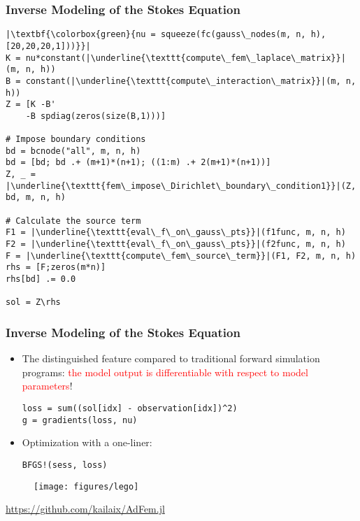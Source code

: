 \documentclass[usenames,dvipsnames]{beamer}
\begin{document}
\begin{frame}[fragile]{}
	\frametitle{Inverse Modeling of the Stokes Equation}
	
	\begin{verbatim}
|\textbf{\colorbox{green}{nu = squeeze(fc(gauss\_nodes(m, n, h),[20,20,20,1]))}}|
K = nu*constant(|\underline{\texttt{compute\_fem\_laplace\_matrix}}|(m, n, h))
B = constant(|\underline{\texttt{compute\_interaction\_matrix}}|(m, n, h))
Z = [K -B'
    -B spdiag(zeros(size(B,1)))]

# Impose boundary conditions
bd = bcnode("all", m, n, h)
bd = [bd; bd .+ (m+1)*(n+1); ((1:m) .+ 2(m+1)*(n+1))]
Z, _ = |\underline{\texttt{fem\_impose\_Dirichlet\_boundary\_condition1}}|(Z, bd, m, n, h)

# Calculate the source term 
F1 = |\underline{\texttt{eval\_f\_on\_gauss\_pts}}|(f1func, m, n, h)
F2 = |\underline{\texttt{eval\_f\_on\_gauss\_pts}}|(f2func, m, n, h)
F = |\underline{\texttt{compute\_fem\_source\_term}}|(F1, F2, m, n, h)
rhs = [F;zeros(m*n)]
rhs[bd] .= 0.0

sol = Z\rhs 
	\end{verbatim}
	
	
\end{frame}



\begin{frame}[fragile]{}
	\frametitle{Inverse Modeling of the Stokes Equation}
	
	\begin{itemize}
		\item The distinguished feature compared to traditional forward simulation programs: \textcolor{red}{the model output is differentiable with respect to model parameters}!
		\begin{verbatim}
loss = sum((sol[idx] - observation[idx])^2)
g = gradients(loss, nu)
		\end{verbatim}
		\item Optimization with a one-liner:
\begin{verbatim}
BFGS!(sess, loss)
\end{verbatim}	 
	\end{itemize}

	\begin{figure}[hbt]
	\centering
	\texttt{[image: figures/lego]}
\end{figure}
\vspace{-0.8cm}
\begin{center}
	\url{https://github.com/kailaix/AdFem.jl}
\end{center}
	
\end{frame}
\end{document}
